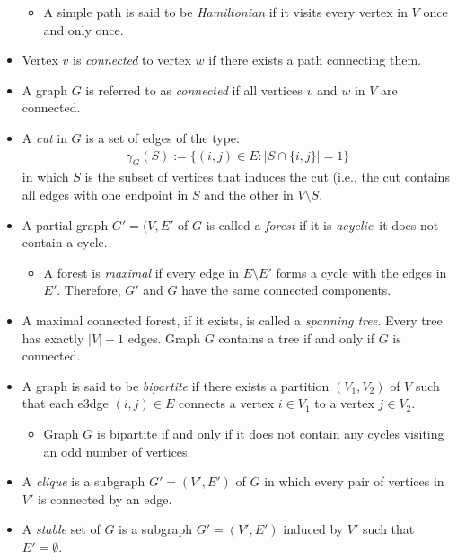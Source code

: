 \documentclass[12pt]{article}
\theoremstyle{definition}
\begin{document}
\begin{itemize}
\begin{itemize}
		\item A simple path is said to be \emph{Hamiltonian} if it visits every vertex in $V$ once and only once.
	\end{itemize}
	\item Vertex $v$ is \emph{connected} to vertex $w$ if there exists a path connecting them. 
	\item A graph $G$ is referred to as \emph{connected} if all vertices $v$ and $w$ in $V$ are connected.
	\item  A \emph{cut} in $G$ is a set of edges of the type:
		\begin{align*}
			\gamma_G(S):= \{(i,j) \in E: |S \cap \{i,j\} | = 1\}
		\end{align*}
	in which $S$ is the subset of vertices that induces the cut (i.e., the cut contains all edges with one endpoint in $S$ and the other in $V \setminus S$. 
	\item A partial graph $G' = (V, E'$ of $G$ is called a \emph{forest} if it is \emph{acyclic}--it does not contain a cycle. 
	\begin{itemize}
		\item A forest is \emph{maximal} if every edge in $E \setminus E'$ forms a cycle with the edges in $E'$. Therefore, $G'$ and $G$ have the same connected components. 
	\end{itemize}
	\item A maximal connected forest, if it exists, is called a \emph{spanning tree}. Every tree has exactly $|V| - 1$ edges. Graph $G$ contains a tree if and only if $G$ is connected. 
	\item A graph is said to be \emph{bipartite} if there exists a partition $(V_1, V_2)$ of $V$ such that each e3dge $(i,j) \in E$ connects a vertex $i \in V_1$ to a vertex $j \in V_2$. 
	\begin{itemize}
		\item Graph $G$ is bipartite if and only if it does not contain any cycles visiting an odd number of vertices.
	\end{itemize}
	\item A \emph{clique} is a subgraph $G' = (V',E')$ of $G$ in which every pair of vertices in $V'$ is connected by an edge.
	\item A \emph{stable} set of $G$ is a subgraph $G' = (V', E')$ induced by $V'$ such that $E' = \emptyset$. 
\end{itemize}
\end{document}
